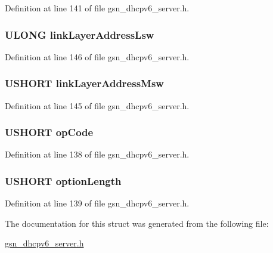 Definition at line 141 of file gsn\_\-dhcpv6\_\-server.h.

\hypertarget{a00017_a50be144cd28d35d01e6e3a0e39e76636}{
\subsubsection[{linkLayerAddressLsw}]{\setlength{\rightskip}{0pt plus 5cm}ULONG {\bf linkLayerAddressLsw}}}
\label{a00017_a50be144cd28d35d01e6e3a0e39e76636}


Definition at line 146 of file gsn\_\-dhcpv6\_\-server.h.

\hypertarget{a00017_ae610244356ee6712be8d75d96eddeb5b}{
\subsubsection[{linkLayerAddressMsw}]{\setlength{\rightskip}{0pt plus 5cm}USHORT {\bf linkLayerAddressMsw}}}
\label{a00017_ae610244356ee6712be8d75d96eddeb5b}


Definition at line 145 of file gsn\_\-dhcpv6\_\-server.h.

\hypertarget{a00017_a5684d9b2c9f50a37e51b1aa5d8b40253}{
\subsubsection[{opCode}]{\setlength{\rightskip}{0pt plus 5cm}USHORT {\bf opCode}}}
\label{a00017_a5684d9b2c9f50a37e51b1aa5d8b40253}


Definition at line 138 of file gsn\_\-dhcpv6\_\-server.h.

\hypertarget{a00017_af8eb97ea691a72b882685220fe0f841d}{
\subsubsection[{optionLength}]{\setlength{\rightskip}{0pt plus 5cm}USHORT {\bf optionLength}}}
\label{a00017_af8eb97ea691a72b882685220fe0f841d}


Definition at line 139 of file gsn\_\-dhcpv6\_\-server.h.



The documentation for this struct was generated from the following file:\begin{DoxyCompactItemize}
\item 
\hyperlink{a00483}{gsn\_\-dhcpv6\_\-server.h}\end{DoxyCompactItemize}
